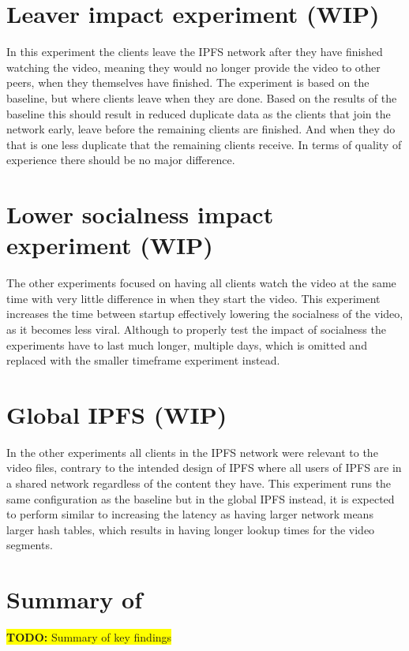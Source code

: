 \section{Leaver impact experiment (WIP)} %
In this experiment the clients  leave the \ac{IPFS} network after they have finished watching the video, meaning they would no longer provide the video to other peers, when they themselves have finished. The experiment is based on the baseline, but where clients leave when they are done. Based on the results of the baseline this should result in reduced duplicate data as the clients that join the network early, leave before the remaining clients are finished. And when they do that is one less duplicate that the remaining clients receive. In terms of quality of experience there should be no major difference.

\section{Lower socialness impact experiment (WIP)} %
The other experiments focused on having all clients watch the video at the same time with very little difference in when they start the video. This experiment increases the time between startup effectively lowering the socialness of the video, as it becomes less viral. Although to properly test the impact of socialness the experiments have to last much longer, multiple days, which is omitted and replaced with the smaller timeframe experiment instead.

\section{Global IPFS (WIP)} %
In the other experiments all clients in the \ac{IPFS} network were relevant to the video files, contrary to the intended design of \ac{IPFS} where all users of \ac{IPFS} are in a shared network regardless of the content they have. This experiment runs the same configuration as the baseline but in the global \ac{IPFS} instead, it is expected to perform similar to increasing the latency as having larger network means larger hash tables, which results in having longer lookup times for the video segments.

\section{Summary of }

\colorbox{yellow}{\textbf{TODO:} Summary of key findings}

